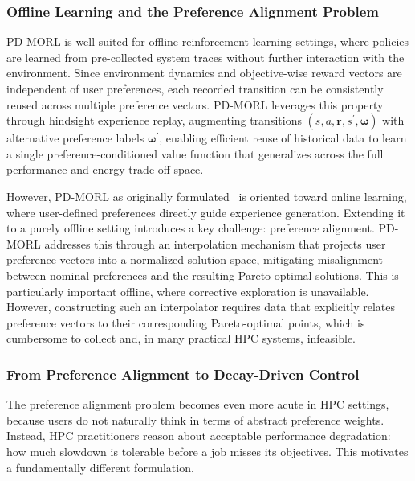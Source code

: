 \subsubsection{Offline Learning and the Preference Alignment Problem}

PD-MORL is well suited for offline reinforcement learning settings, where policies are learned from pre-collected system traces without further interaction with the environment. Since environment dynamics and objective-wise reward vectors are independent of user preferences, each recorded transition can be consistently reused across multiple preference vectors. PD-MORL leverages this property through hindsight experience replay, augmenting transitions $(s,a,\mathbf{r},s^{\prime},\boldsymbol{\omega})$ with alternative preference labels $\boldsymbol{\omega}^{\prime}$, enabling efficient reuse of historical data to learn a single preference-conditioned value function that generalizes across the full performance and 
energy trade-off space.

However, PD-MORL as originally formulated~\cite{basaklar2023pdmorlpreferencedrivenmultiobjectivereinforcement} is oriented toward online learning, where user-defined preferences 
directly guide experience generation. Extending it to a purely offline setting introduces a key challenge: preference alignment. PD-MORL addresses this through an interpolation mechanism that projects user preference vectors into a normalized solution space, mitigating misalignment between nominal preferences and the resulting Pareto-optimal solutions. This is particularly important offline, where corrective exploration is unavailable. However, constructing such an interpolator requires data that explicitly relates preference vectors to their corresponding Pareto-optimal points, which is cumbersome to collect and, in many practical HPC systems, infeasible.

\subsubsection{From Preference Alignment to Decay-Driven Control}

The preference alignment problem becomes even more acute in HPC settings, because users do not naturally think in terms of abstract preference weights. Instead, HPC practitioners reason about acceptable performance degradation: how much slowdown is tolerable before a job misses its objectives. This motivates a fundamentally different formulation.

